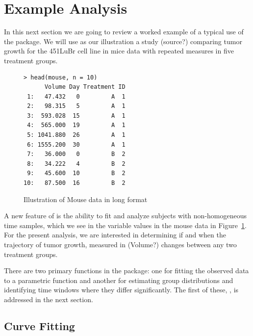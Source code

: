 \section{Example Analysis}

In this next section we are going to review a worked example of a typical use of the  package. We will use as our illustration a study (source?) comparing tumor growth for the 451LuBr cell line in mice data with repeated measures in five treatment groups.

\begin{singlespace}
\begin{figure}[H]
\centering
\begin{BVerbatim}
> head(mouse, n = 10)
      Volume Day Treatment ID
 1:   47.432   0         A  1
 2:   98.315   5         A  1
 3:  593.028  15         A  1
 4:  565.000  19         A  1
 5: 1041.880  26         A  1
 6: 1555.200  30         A  1
 7:   36.000   0         B  2
 8:   34.222   4         B  2
 9:   45.600  10         B  2
10:   87.500  16         B  2
\end{BVerbatim}
\caption{Illustration of Mouse data in long format}
\label{fig:mouse_head}
\end{figure}
\end{singlespace}

A new feature of  is the ability to fit and analyze subjects with non-homogeneous time samples, which we see in the  variable values in the mouse data in Figure~\ref{fig:mouse_head}.  For the present analysis, we are interested in determining if and when the trajectory of tumor growth, measured in (Volume?) changes between any two treatment groups.

There are two primary functions in the  package: one for fitting the observed data to a parametric function and another for estimating group distributions and identifying time windows where they differ significantly. The first of these, , is addressed in the next section.


\subsection{Curve Fitting}

